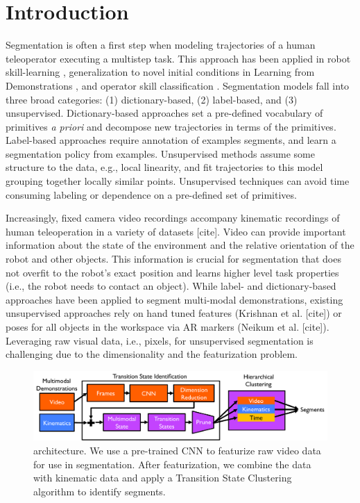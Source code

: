 \section{Introduction}
Segmentation is often a first step when modeling trajectories of a human teleoperator executing a multistep task.
This approach has been applied in robot skill-learning \cite{calinon2010learning, kruger2010learning, konidaris2011robot}, generalization to novel initial conditions in Learning from Demonstrations \cite{Niekum2015}, and operator skill classification \cite{Reiley2009}.
Segmentation models fall into three broad categories: (1) dictionary-based, (2) label-based, and (3) unsupervised.
Dictionary-based approaches set a pre-defined vocabulary of primitives \emph{a priori} and decompose new trajectories in terms of the primitives.
Label-based approaches require annotation of examples segments, and learn a segmentation policy from examples.
Unsupervised methods assume some structure to the data, e.g., local linearity, and fit trajectories to this model grouping together locally similar points.
Unsupervised techniques can avoid time consuming labeling or dependence on a pre-defined set of primitives.

Increasingly, fixed camera video recordings accompany kinematic recordings of human teleoperation in a variety of datasets [cite].
Video can provide important information about the state of the environment and the relative orientation of the robot and other objects.
This information is crucial for segmentation that does not overfit to the robot's exact position and learns higher level task properties (i.e., the robot needs to contact an object).
While label- and dictionary-based approaches have been applied to segment multi-modal demonstrations\cite{DBLP:dblp_conf/wacv/LeaHV15,zappella2013surgical}, existing unsupervised approaches rely on hand tuned features (Krishnan et al. [cite]) or poses for all objects in the workspace via AR markers (Neikum et al. [cite]).
Leveraging raw visual data, i.e., pixels, for unsupervised segmentation is challenging due to the dimensionality and the featurization problem.

\begin{figure}[ht]
\centering
\includegraphics[width=\columnwidth]{figures/architecture.pdf}
\caption{ architecture. We use a pre-trained CNN to featurize raw video data for use in segmentation. After featurization, we combine the data with kinematic data and apply a Transition State Clustering algorithm to identify segments. \label{fig:arch}}
\vspace{-1em}
\end{figure}

